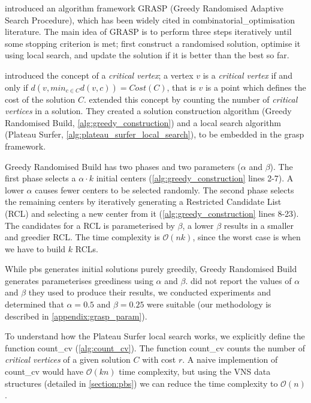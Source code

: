 \textcite{feo_greedy_1995} introduced an algorithm framework GRASP (Greedy Randomised Adaptive Search Procedure), which has been widely cited in \gls{combinatorial_optimisation} literature. The main idea of GRASP is to perform three steps iteratively until some stopping criterion is met; first construct a randomised solution, optimise it using local search, and update the solution if it is better than the best so far.



\textcite{mladenovic_solving_2003} introduced the concept of a \emph{critical vertex}; a vertex $v$ is a \emph{critical vertex} if and only if $d(v, min_{c\in C}d(v, c))=Cost(C)$, that is $v$ is a point which defines the cost of the solution $C$. \textcite{battiti_new_2017} extended this concept by counting the number of \emph{critical vertices} in a solution. They created a solution construction algorithm (Greedy Randomised Build, \cref{alg:greedy_construction}) and a local search algorithm (Plateau Surfer, \cref{alg:plateau_surfer_local_search}), to be embedded in the \acrshort{grasp} framework.

Greedy Randomised Build has two phases and two parameters ($\alpha$ and $\beta$). The first phase selects a $\alpha\cdot k$ initial centers (\cref{alg:greedy_construction} lines 2-7). A lower $\alpha$ causes fewer centers to be selected randomly. The second phase selects the remaining centers by iteratively generating a Restricted Candidate List (RCL) and selecting a new center from it (\cref{alg:greedy_construction} lines 8-23). The candidates for a RCL is parameterised by $\beta$, a lower $\beta$ results in a smaller and greedier RCL. The time complexity is $\mathcal{O}(nk)$, since the worst case is when we have to build $k$ RCLs. 

While \acrshort{pbs} generates initial solutions purely greedily, Greedy Randomised Build generates parameterises greediness using $\alpha$ and $\beta$. \citeauthor{battiti_new_2017} did not report the values of $\alpha$ and $\beta$ they used to produce their results, we conducted experiments and determined that $\alpha =0.5$ and $\beta =0.25$ were suitable (our methodology is described in \cref{appendix:grasp_param}).



To understand how the Plateau Surfer local search works, we explicitly define the function count\_cv (\cref{alg:count_cv}). The function count\_cv counts the number of \emph{critical vertices} of a given solution $C$ with cost $r$. A naive implemention of count\_cv would have $\mathcal{O}(kn)$ time complexity, but using the VNS data structures (detailed in \cref{section:pbs}) we can reduce the time complexity to $\mathcal{O}(n)$ . 

